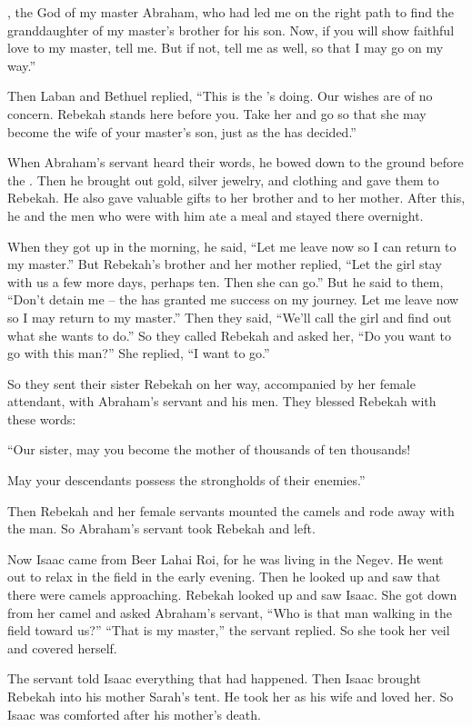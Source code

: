 {{}, the God
of my master
Abraham,
who had
led
me on the right
path
to find
the
granddaughter
of my master’s
brother
for his son.
Now,
if
you will show
faithful
love
to
my master,
tell
me. But if
not,
tell
me as well, so
that I may go
on
my way.”
\par }{\PP {}Then Laban
and Bethuel
replied,
“This is the
{}’s
doing.
Our wishes
are of
no
concern.
Rebekah
stands here before
you. Take
her and go
so that she may become
the wife
of your master’s
son,
just
as the
{}
has decided.”
\par }{\PP {}When
Abraham’s
servant
heard
their words,
he bowed
down to the ground
before the
{}.
Then he
brought out
gold,
silver
jewelry,
and clothing
and gave
them to Rebekah.
He also gave
valuable
gifts to her brother
and to her mother.
After
this, he and the men
who
were with
him ate
a meal
and stayed there overnight.
\par }{\PP When they got
up in the morning,
he said,
“Let
me leave now so I can return to my master.”
But Rebekah’s brother
and her mother
replied,
“Let the girl
stay
with
us a few more days,
perhaps ten.
Then
she can go.”
But he said
to
them, “Don’t
detain me – the
{} has granted me success on my journey. Let me leave now so I may return to my master.”
Then they said,
“We’ll call
the girl
and find
out what
she wants
to do.”
So they called
Rebekah
and asked
her, “Do you want to
go
with
this
man?” She replied,
“I want to go.”
\par }{\PP {}So they sent
their sister
Rebekah
on her way, accompanied by her female attendant,
with Abraham’s
servant
and his men.
They blessed
Rebekah
with these words:

\par }{\Q “Our sister,
may you
become
the mother of thousands
of ten thousands!
\par }{\Q May your descendants
possess
the strongholds
of their enemies.”
\par }{\PP {}Then
Rebekah
and her female
servants mounted
the camels
and rode away
with the man.
So Abraham’s servant
took
Rebekah
and left.
\par }{\PP {}Now Isaac
came
from
Beer Lahai Roi,
for he
was living
in the Negev.
He
went out
to relax
in the field
in the early evening.
Then he looked
up
and saw
that there
were camels
approaching.
Rebekah
looked
up and saw
Isaac.
She got down
from her camel
and asked
Abraham’s servant, “Who
is that man
walking
in the field
toward
us?” “That is my master,”
the servant
replied.
So she took
her veil
and covered herself.
\par }{\PP {}The servant
told
Isaac
everything
that had
happened.
Then Isaac
brought
Rebekah
into his mother
Sarah’s
tent.
He took
her as his wife
and loved
her. So Isaac
was comforted
after
his mother’s death.

}

